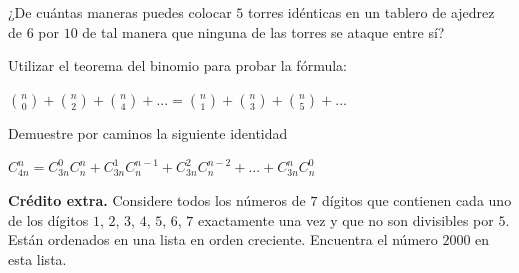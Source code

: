 \documentclass[12pt]{article}
\begin{document}
\begin{problema}
   ¿De cuántas maneras puedes colocar $5$ torres idénticas en un tablero de ajedrez de $6$ por $10$ de tal manera que ninguna de las torres se ataque entre sí? 
\end{problema}

\begin{problema}
   Utilizar el teorema del binomio para probar la fórmula:

   \begin{center}
       $\binom{n}{0} + \binom{n}{2} + \binom{n}{4} + ... = \binom{n}{1} + \binom{n}{3} + \binom{n}{5} + ...$
   \end{center}
\end{problema}

\newpage

\begin{problema}
   Demuestre por caminos la siguiente identidad

   \begin{center}
       $C^{n}_{4n} = C^{0}_{3n} C^{n}_{n} + C^{1}_{3n} C^{n-1}_{n} + C^{2}_{3n} C^{n-2}_{n} + ... + C^{n}_{3n} C^{0}_{n}$
   \end{center}
\end{problema}


\textbf{Crédito extra.} Considere todos los números de $7$ dígitos que contienen cada uno de los dígitos $1$, $2$, $3$, $4$, $5$, $6$, $7$ exactamente una vez y que no son divisibles por $5$. Están ordenados en una lista en orden creciente. Encuentra el número $2000$ en esta lista.
\end{document}
